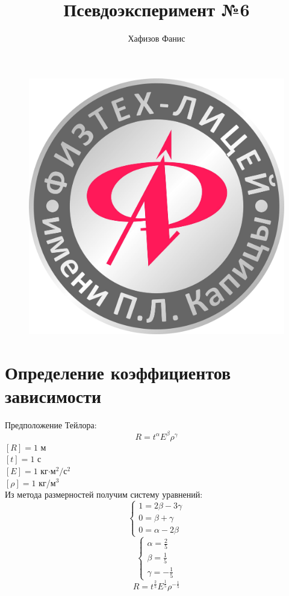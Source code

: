 \documentclass[12pt]{article}
\title{Псевдоэксперимент №6}
\author{Хафизов Фанис}
\begin{document}
	\begin{figure}
		\centering
		\includegraphics[width=0.3\linewidth]{logo}
	\end{figure}
	\maketitle
	\newpage
	\section{Определение коэффициентов зависимости}
	Предположение Тейлора:
	$$R=t^\alpha E^\beta \rho^\gamma$$
	$[R] = 1$ м\\
	$[t] = 1$ с\\
	$[E] = 1$ кг$\cdot$м$^2/$с$^2$\\
	$[\rho] = 1$ кг/м$^3$\\
	Из метода размерностей получим систему уравнений:
	\begin{equation*}
		\begin{cases}
			1=2\beta-3\gamma\\
			0=\beta+\gamma\\
			0=\alpha-2\beta
		\end{cases}
	\end{equation*}
	\begin{equation*}	
		\begin{cases}
			\alpha = \frac{2}{5}\\
			\beta = \frac{1}{5}\\
			\gamma = -\frac{1}{5}
		\end{cases}
	\end{equation*}
	$$R = t^\frac{2}{5}E^\frac{1}{5}\rho^{-\frac{1}{5}}$$
\end{document}
